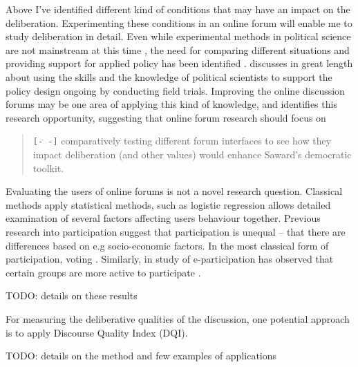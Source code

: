 \documentclass[journal,a4paper]{IEEEtran}
\begin{document}
Above I've identified different kind of conditions that may have an impact on the deliberation. Experimenting these conditions in an online forum will enable me to study deliberation in detail. Even while experimental methods in political science are not mainstream at this time \cite{green03,druckman06}, the need for comparing different situations and providing support for applied policy has been identified \cite{stoker10}.  discusses in great length about using the skills and the knowledge of political scientists to support the policy design ongoing by conducting field trials. Improving the online discussion forums may be one area of applying this kind of knowledge, and  identifies this research opportunity, suggesting that online forum research should focus on

\begin{quote}
\texttt{[- -]} comparatively testing different forum interfaces to see how they impact deliberation (and other values) would 
enhance Saward’s democratic toolkit.
\end{quote}

Evaluating the users of online forums is not a novel research question. Classical methods apply statistical methods, such as logistic regression allows detailed examination of several factors affecting users behaviour together. Previous research into participation suggest that participation is unequal -- that there are differences based on e.g socio-economic factors. In the most classical form of participation, voting . Similarly, in study of e-participation has observed that certain groups are more active to participate \cite{albrecht06,strandberg08}.

TODO: details on these results

For measuring the deliberative qualities of the discussion, one potential approach is to apply  Discourse Quality Index (DQI).

TODO: details on the method and few examples of applications



\end{document}
